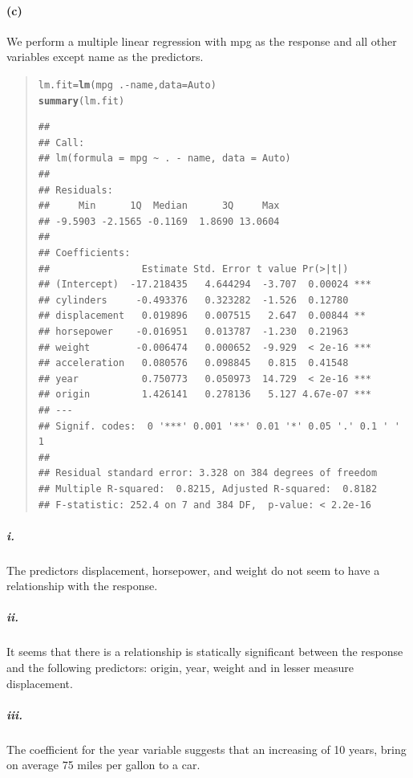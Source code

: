 \documentclass[a4paper, 10pt]{scrartcl}\usepackage[]{graphicx}\usepackage[]{color}
\makeatletter
\newcommand{\hlopt}[1]{\textcolor[rgb]{0,0,0}{#1}}%
\newcommand{\hlstd}[1]{\textcolor[rgb]{0.345,0.345,0.345}{#1}}%
\newcommand{\hlkwb}[1]{\textcolor[rgb]{0.69,0.353,0.396}{#1}}%
\newcommand{\hlkwc}[1]{\textcolor[rgb]{0.333,0.667,0.333}{#1}}%
\newcommand{\hlkwd}[1]{\textcolor[rgb]{0.737,0.353,0.396}{\textbf{#1}}}%
\newenvironment{kframe}{%
 \def\at@end@of@kframe{}%
 \ifinner\ifhmode%
  \def\at@end@of@kframe{\end{minipage}}%
  \begin{minipage}{\columnwidth}%
 \fi\fi%
 \def\FrameCommand##1{\hskip\@totalleftmargin \hskip-\fboxsep
 \colorbox{shadecolor}{##1}\hskip-\fboxsep
     \hskip-\linewidth \hskip-\@totalleftmargin \hskip\columnwidth}%
 \MakeFramed {\advance\hsize-\width
   \@totalleftmargin\z@ \linewidth\hsize
   \@setminipage}}%
 {\par\unskip\endMakeFramed%
 \at@end@of@kframe}
\newenvironment{knitrout}{}{} %
\makeatother
\begin{document}
\paragraph{(c)} We perform a multiple linear regression with mpg as the
response and all other variables except name as the predictors.
\begin{abstract}
\begin{knitrout}
\color{fgcolor}\begin{kframe}
\begin{alltt}
\hlstd{lm.fit} \hlkwb{=} \hlkwd{lm}\hlstd{(mpg}\hlopt{~}\hlstd{.}\hlopt{-}\hlstd{name,} \hlkwc{data}\hlstd{=Auto)}
\hlkwd{summary}\hlstd{(lm.fit)}
\end{alltt}
\begin{verbatim}
## 
## Call:
## lm(formula = mpg ~ . - name, data = Auto)
## 
## Residuals:
##     Min      1Q  Median      3Q     Max 
## -9.5903 -2.1565 -0.1169  1.8690 13.0604 
## 
## Coefficients:
##                Estimate Std. Error t value Pr(>|t|)    
## (Intercept)  -17.218435   4.644294  -3.707  0.00024 ***
## cylinders     -0.493376   0.323282  -1.526  0.12780    
## displacement   0.019896   0.007515   2.647  0.00844 ** 
## horsepower    -0.016951   0.013787  -1.230  0.21963    
## weight        -0.006474   0.000652  -9.929  < 2e-16 ***
## acceleration   0.080576   0.098845   0.815  0.41548    
## year           0.750773   0.050973  14.729  < 2e-16 ***
## origin         1.426141   0.278136   5.127 4.67e-07 ***
## ---
## Signif. codes:  0 '***' 0.001 '**' 0.01 '*' 0.05 '.' 0.1 ' ' 1
## 
## Residual standard error: 3.328 on 384 degrees of freedom
## Multiple R-squared:  0.8215,	Adjusted R-squared:  0.8182 
## F-statistic: 252.4 on 7 and 384 DF,  p-value: < 2.2e-16
\end{verbatim}
\end{kframe}
\end{knitrout}
\end{abstract}
\subparagraph{i.} The predictors displacement, horsepower, and weight
do not seem to have a relationship with the response.
\subparagraph{ii.} It seems that there is a relationship is statically
significant between the response and the following predictors: origin,
year, weight and in lesser measure displacement.
\subparagraph{iii.} The coefficient for the year variable suggests that
an increasing of 10 years, bring on average 75 miles per gallon to a
car.
\end{document}
